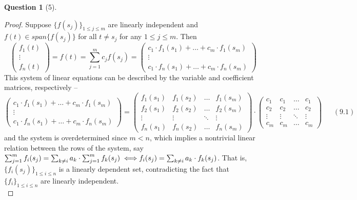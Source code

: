 \documentclass[11pt]{article}
\theoremstyle{quest}
\newtheorem*{question}{Question}
\begin{document}
\begin{question}[5]
\end{question}
\begin{proof}
Suppose $\{f(s_j)\}_{1 \le j \le m}$ are linearly independent and $f(t) \in span\{f(s_j)\}$ for all $t \ne s_j$ for any $1 \le j \le m$. Then
$$\begin{pmatrix}
f_1(t) \\
\vdots \\
f_n(t)
\end{pmatrix} = f(t) = \sum_{j=1}^m c_j f(s_j) = \begin{pmatrix}
c_1 \cdot f_1(s_1) + \ldots + c_m \cdot f_1(s_m) \\
\vdots \\
c_1 \cdot f_n(s_1) + \ldots + c_m \cdot f_n(s_m)
\end{pmatrix}$$
This system of linear equations can be described by the variable and coefficient matrices, respectively -- 
$$\begin{pmatrix}
c_1 \cdot f_1(s_1) + \ldots + c_m \cdot f_1(s_m) \\
\vdots \\
c_1 \cdot f_n(s_1) + \ldots + c_m \cdot f_n(s_m)
\end{pmatrix} = \begin{pmatrix}
f_1(s_1) & f_1(s_2) & \ldots & f_1(s_m) \\
f_2(s_1) & f_2(s_2) & \ldots & f_2(s_m) \\
\vdots & \vdots & \ddots & \vdots \\
f_n(s_1) & f_n(s_2) & \ldots & f_n(s_m)
\end{pmatrix} \cdot \begin{pmatrix} c_1 & c_1 & \ldots & c_1 \\
c_2 & c_2 & \ldots & c_2 \\
\vdots & \vdots & \ddots & \vdots \\
c_m & c_m & \ldots & c_m
\end{pmatrix}\ \ \ \ \ \ \ (9.1)$$
and the system is overdetermined since $m < n$, 
which implies a nontrivial linear relation between the rows of the system, say $\sum_{j=1}^m f_i(s_j) = \sum_{k \ne i} a_k \cdot \sum_{j=1}^m f_k(s_j) \iff \\f_i(s_j) = \sum_{k \ne i} a_k \cdot f_k(s_j)$. That is, $\{f_i(s_j)\}_{1 \le i \le n}$ is a linearly dependent set, contradicting the fact that $\{f_i\}_{1 \le i \le n}$ are linearly independent.
\\
\end{proof}
\end{document}
